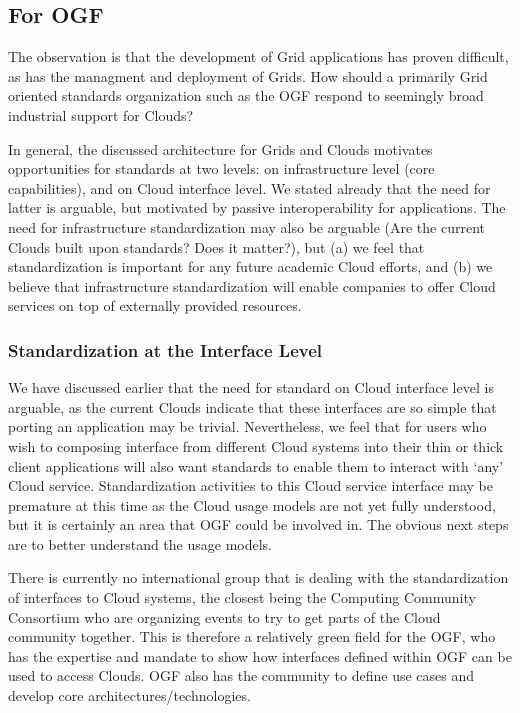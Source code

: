 \documentclass[conference,final]{IEEEtran}
\begin{document}
 \subsection{For OGF}
 
  The observation is that the development of Grid applications has
  proven difficult, as has the managment and deployment of Grids.  How
  should a primarily Grid oriented standards organization such as the
  OGF respond to seemingly broad industrial support for Clouds?
  
  In general, the discussed architecture for Grids and Clouds
  motivates opportunities for standards at two levels: on
  infrastructure level (core capabilities), and on Cloud interface
  level.  We stated already that the need for latter is arguable, but
  motivated by passive interoperability for applications.  The need
  for infrastructure standardization may also be arguable (Are the
  current Clouds built upon standards?  Does it matter?), but (a) we
  feel that standardization is important for any future academic Cloud
  efforts, and (b) we believe that infrastructure standardization will
  enable companies to offer Cloud services on top of externally
  provided resources.

  \subsubsection{Standardization at the Interface Level}

   We have discussed earlier that the need for standard on Cloud
   interface level is arguable, as the current Clouds indicate that
   these interfaces are so simple that porting an application may be
   trivial.  Nevertheless, we feel that for users who wish to
   composing interface from different Cloud systems into their thin or
   thick client applications will also want standards to enable them
   to interact with ‘any’ Cloud service.  Standardization activities
   to this Cloud service interface may be premature at this time as
   the Cloud usage models are not yet fully understood, but it is
   certainly an area that OGF could be involved in.  The obvious next
   steps are to better understand the usage models.

   There is currently no international group that is dealing with the
   standardization of interfaces to Cloud systems, the closest being
   the Computing Community Consortium who are organizing events to try
   to get parts of the Cloud community together.  This is therefore a
   relatively green field for the OGF, who has the expertise and
   mandate to show how interfaces defined within OGF can be used to
   access Clouds.  OGF also has the community to define use cases and
   develop core architectures/technologies.
\end{document}
